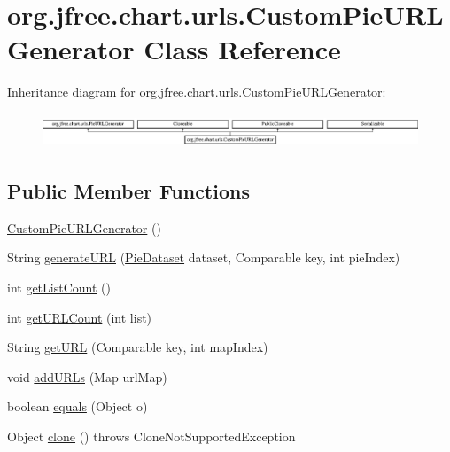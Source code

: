 \hypertarget{classorg_1_1jfree_1_1chart_1_1urls_1_1_custom_pie_u_r_l_generator}{}\section{org.\+jfree.\+chart.\+urls.\+Custom\+Pie\+U\+R\+L\+Generator Class Reference}
\label{classorg_1_1jfree_1_1chart_1_1urls_1_1_custom_pie_u_r_l_generator}
Inheritance diagram for org.\+jfree.\+chart.\+urls.\+Custom\+Pie\+U\+R\+L\+Generator\+:\begin{figure}[H]
\begin{center}
\leavevmode
\includegraphics[height=1.037037cm]{classorg_1_1jfree_1_1chart_1_1urls_1_1_custom_pie_u_r_l_generator}
\end{center}
\end{figure}
\subsection*{Public Member Functions}
\begin{DoxyCompactItemize}
\item 
\mbox{\hyperlink{classorg_1_1jfree_1_1chart_1_1urls_1_1_custom_pie_u_r_l_generator_a28d685d6ea19e6623862056f70f1fe4a}{Custom\+Pie\+U\+R\+L\+Generator}} ()
\item 
String \mbox{\hyperlink{classorg_1_1jfree_1_1chart_1_1urls_1_1_custom_pie_u_r_l_generator_a11ce6515b07b18131adeff215e7c5ca4}{generate\+U\+RL}} (\mbox{\hyperlink{interfaceorg_1_1jfree_1_1data_1_1general_1_1_pie_dataset}{Pie\+Dataset}} dataset, Comparable key, int pie\+Index)
\item 
int \mbox{\hyperlink{classorg_1_1jfree_1_1chart_1_1urls_1_1_custom_pie_u_r_l_generator_ac351567812ec8a57390ae5dbb2d13027}{get\+List\+Count}} ()
\item 
int \mbox{\hyperlink{classorg_1_1jfree_1_1chart_1_1urls_1_1_custom_pie_u_r_l_generator_adde3608853a6d2d98ae82673e3f65121}{get\+U\+R\+L\+Count}} (int list)
\item 
String \mbox{\hyperlink{classorg_1_1jfree_1_1chart_1_1urls_1_1_custom_pie_u_r_l_generator_aadbe1f25d7ac99d5fb746dd171d815a9}{get\+U\+RL}} (Comparable key, int map\+Index)
\item 
void \mbox{\hyperlink{classorg_1_1jfree_1_1chart_1_1urls_1_1_custom_pie_u_r_l_generator_abb4278b15b8a6aecf4212f26176c2e48}{add\+U\+R\+Ls}} (Map url\+Map)
\item 
boolean \mbox{\hyperlink{classorg_1_1jfree_1_1chart_1_1urls_1_1_custom_pie_u_r_l_generator_ad0557aa7217c1f9e9f856e2fa1d19454}{equals}} (Object o)
\item 
Object \mbox{\hyperlink{classorg_1_1jfree_1_1chart_1_1urls_1_1_custom_pie_u_r_l_generator_a138c6be61492891b1373d42c3c96c93f}{clone}} ()  throws Clone\+Not\+Supported\+Exception 
\end{DoxyCompactItemize}


